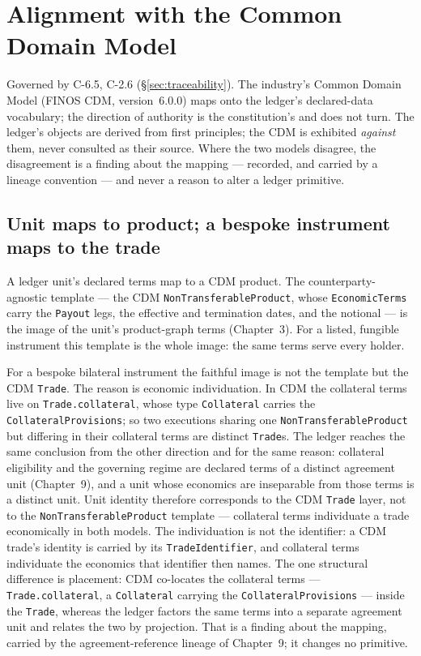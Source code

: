\documentclass[11pt,a4paper]{article}
\begin{document}
\section{Alignment with the Common Domain Model}\label{ch:cdm}

Governed by C-6.5, C-2.6 (\S\ref{sec:traceability}). The industry's Common Domain Model (FINOS
CDM, version~6.0.0) maps onto the ledger's declared-data vocabulary; the direction of
authority is the constitution's and does not turn. The ledger's objects are
derived from first principles; the CDM is exhibited \emph{against} them, never
consulted as their source. Where the two models disagree, the disagreement is a
finding about the mapping --- recorded, and carried by a lineage convention ---
and never a reason to alter a ledger primitive.

\subsection{Unit maps to product; a bespoke instrument maps to the trade}

A ledger unit's declared terms map to a CDM product. The counterparty-agnostic
template --- the CDM \texttt{NonTransferableProduct}, whose \texttt{EconomicTerms}
carry the \texttt{Payout} legs, the effective and termination dates, and the
notional --- is the image of the unit's product-graph terms (Chapter~3). For a
listed, fungible instrument this template is the whole image: the same terms
serve every holder.

For a bespoke bilateral instrument the faithful image is not the template but
the CDM \texttt{Trade}. The reason is economic individuation. In CDM the
collateral terms live on \texttt{Trade.collateral}, whose type
\texttt{Collateral} carries the \texttt{CollateralProvisions}; so two executions
sharing one \texttt{NonTransferableProduct} but differing in their collateral
terms are distinct \texttt{Trade}s. The ledger reaches the same conclusion from
the other direction and for the same reason: collateral eligibility and the
governing regime are declared terms of a distinct agreement unit
(Chapter~9), and a unit whose economics are inseparable from those terms is a
distinct unit. Unit identity therefore corresponds to the CDM \texttt{Trade}
layer, not to the \texttt{NonTransferableProduct} template --- collateral terms
individuate a trade economically in both models. The individuation is not the
identifier: a CDM trade's identity is carried by its \texttt{TradeIdentifier},
and collateral terms individuate the economics that identifier then names. The
one structural difference is placement: CDM co-locates the collateral terms ---
\texttt{Trade.collateral}, a \texttt{Collateral} carrying the
\texttt{CollateralProvisions} --- inside the \texttt{Trade}, whereas the ledger
factors the same terms into a separate agreement unit and relates the two by
projection. That is a finding about the mapping, carried by the
agreement-reference lineage of Chapter~9; it changes no primitive.
\end{document}
